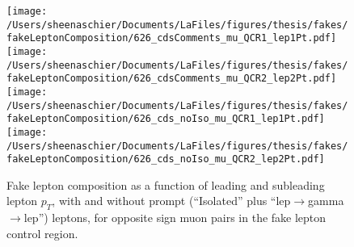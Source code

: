 \documentclass[11pt, oneside]{article}   	%
\begin{document}
\begin{figure}[htb]
        \centering
        \texttt{[image: /Users/sheenaschier/Documents/LaFiles/figures/thesis/fakes/fakeLeptonComposition/626\_cdsComments\_mu\_QCR1\_lep1Pt.pdf]}
        \texttt{[image: /Users/sheenaschier/Documents/LaFiles/figures/thesis/fakes/fakeLeptonComposition/626\_cdsComments\_mu\_QCR2\_lep2Pt.pdf]}
        \texttt{[image: /Users/sheenaschier/Documents/LaFiles/figures/thesis/fakes/fakeLeptonComposition/626\_cds\_noIso\_mu\_QCR1\_lep1Pt.pdf]}
        \texttt{[image: /Users/sheenaschier/Documents/LaFiles/figures/thesis/fakes/fakeLeptonComposition/626\_cds\_noIso\_mu\_QCR2\_lep2Pt.pdf]}
        \caption{Fake lepton composition as a function of leading and subleading lepton $p_{T}$, with and without prompt (``Isolated'' plus ``lep$\to$gamma$\to$lep'') leptons, for opposite sign muon pairs in the fake lepton control region.}
        \label{fig:muCR}
\end{figure}
\end{document}
